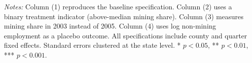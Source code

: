 \begin{table}[htbp]
   \par \raggedright
   \textit{Notes:} Column (1) reproduces the baseline specification. Column (2) uses a binary treatment indicator (above-median mining share). Column (3) measures mining share in 2003 instead of 2005. Column (4) uses log non-mining employment as a placebo outcome. All specifications include county and quarter fixed effects. Standard errors clustered at the state level. * $p<0.05$, ** $p<0.01$, *** $p<0.001$.
\end{table}
